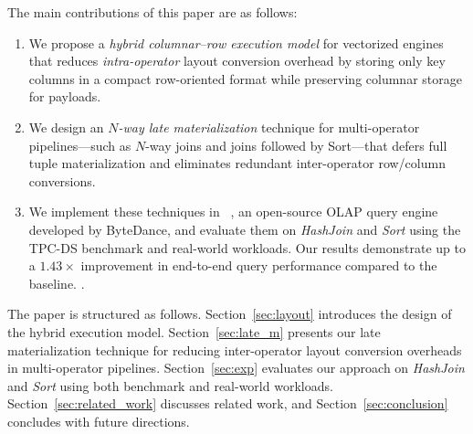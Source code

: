 The main contributions of this paper are as follows:
\begin{enumerate}[leftmargin=*,topsep=0.3em]
    \item We propose a \emph{hybrid columnar--row execution model} for vectorized engines that reduces \emph{intra-operator} layout conversion overhead by storing only key columns in a compact row-oriented format while preserving columnar storage for payloads.
    \item We design an \emph{$N$-way late materialization} technique for multi-operator pipelines—such as $N$-way joins and joins followed by Sort—that defers full tuple materialization and eliminates redundant inter-operator row/column conversions.
    \item We implement these techniques in \proj~\cite{bolt}, an open-source OLAP query engine developed by ByteDance, and evaluate them on \emph{HashJoin} and \emph{Sort} using the TPC-DS benchmark and real-world workloads. Our results demonstrate up to a $1.43\times$ improvement in end-to-end query performance compared to the baseline. .
\end{enumerate}





The paper is structured as follows.
Section~\ref{sec:layout} introduces the design of the hybrid execution model.
Section~\ref{sec:late_m} presents our late materialization technique for reducing inter-operator layout conversion overheads in multi-operator pipelines.
Section~\ref{sec:exp} evaluates our approach on \emph{HashJoin} and \emph{Sort} using both benchmark and real-world workloads.
Section~\ref{sec:related_work} discusses related work, and Section~\ref{sec:conclusion} concludes with future directions.












